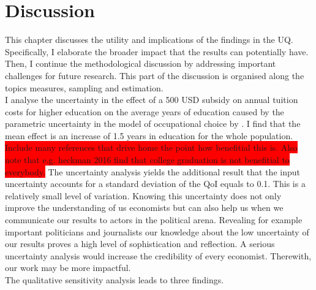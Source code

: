 \section{Discussion}
\thispagestyle{plain}  %

This chapter discusses the utility and implications of the findings in the UQ. Specifically, I elaborate the broader impact that the results can potentially have. Then, I continue the methodological discussion by addressing important challenges for future research. This part of the discussion is organised along the topics measures, sampling and estimation.\\

\noindent
I analyse the uncertainty in  the effect of a 500 USD subsidy on annual tuition costs for higher education on the average years of education caused by the parametric uncertainty in the model of occupational choice by \cite{Keane.1994}. I find that the mean effect is an increase of 1.5 years in education for the whole population. \colorbox{red}{Include many references that drive home the point how benefitial this is. Also note that e.g. heckman 2016 find that college graduation is not benefitial to everybody.}
The uncertainty analysis yields the additional result that the input uncertainty accounts for a standard deviation of the QoI equals to 0.1. This is a relatively small level of variation. Knowing this uncertainty does not only improve the understanding of us economists but can also help us when we communicate our results to actors in the political arena. Revealing for example important politicians and journalists our knowledge about the low uncertainty of our results proves a high level of sophistication and reflection. A serious uncertainty analysis would increase the credibility of every economist. Therewith, our work may be more impactful.\\

\noindent
The qualitative sensitivity analysis leads to three findings.

